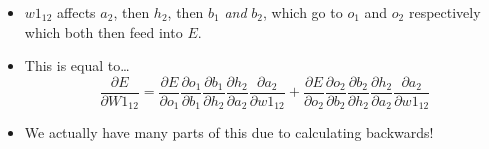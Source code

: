 \documentclass{article}
\begin{document}
\begin{itemize}
    \item $w1_{12}$ affects $a_2$, then $h_2$, then $b_1$ \emph{and} $b_2$, which go to $o_1$ and $o_2$ respectively which both then feed into $E$.
    \item This is equal to\dots
        \[
            \frac{\partial E}{\partial W1_{12}} = \frac{\partial E}{\partial o_1} \frac{\partial o_1}{\partial b_1} \frac{\partial b_1}{\partial h_2} \frac{\partial h_2}{\partial a_2} \frac{\partial a_2}{\partial w1_{12}} + \frac{\partial E}{\partial o_2} \frac{\partial o_2}{\partial b_2} \frac{\partial b_2}{\partial h_2} \frac{\partial h_2}{\partial a_2} \frac{\partial a_2}{\partial w1_{12}}
        \]
    \item We actually have many parts of this due to calculating backwards!
\end{itemize}
\end{document}
